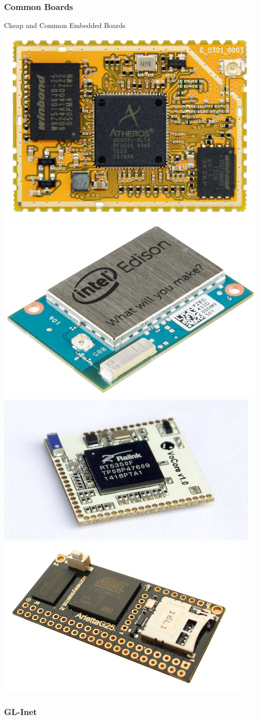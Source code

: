 \documentclass[hyperref={unicode}]{beamer}
\begin{document}
\subsubsection{Common Boards}

\begin{frame}{Cheap and Common Embedded Boards}
	\centering
	\includegraphics[width=.40\linewidth]{carambola2.png}
	\includegraphics[width=.40\textwidth]{intel-edison.jpg}
	\vskip 1cm
	\includegraphics[width=.40\linewidth]{vocore.jpg}
	\includegraphics[width=.40\textwidth]{arietta-g25.jpg}
\end{frame}

\subsubsection{GL-Inet}
\end{document}
